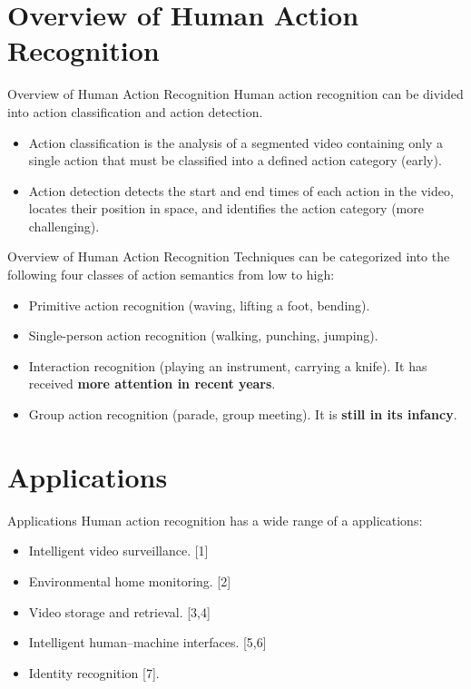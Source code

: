 
\section{Overview of Human Action Recognition}
\begin{frame}{Overview of Human Action Recognition}
    Human action recognition can be divided into action classification and action detection.
    \begin{itemize}
        \item Action classification is the analysis of a segmented video containing only a single action that must be classified into a defined action category (early).
        \item Action detection detects the start and end times of each action in the video, locates their position in space, and identifies the action category (more challenging).
    \end{itemize}
\end{frame}

\begin{frame}{Overview of Human Action Recognition}
    Techniques can be categorized into the following four classes of action semantics from low to high:
    \begin{itemize}
        \item Primitive action recognition (waving, lifting a foot, bending).
        \item Single-person action recognition (walking, punching, jumping).
        \item Interaction recognition (playing an instrument, carrying a knife). It has received \textbf{more attention in recent years}.
        \item Group action recognition (parade, group meeting). It is \textbf{still in its infancy}.
    \end{itemize}
\end{frame}

\section{Applications}
\begin{frame}{Applications}
    Human action recognition has a wide range of a applications:

    \begin{itemize}
        \item Intelligent video surveillance. [1]
        \item Environmental home monitoring. [2]
        \item Video storage and retrieval. [3,4]
        \item Intelligent human–machine interfaces. [5,6]
        \item Identity recognition [7].
    \end{itemize}
\end{frame}

